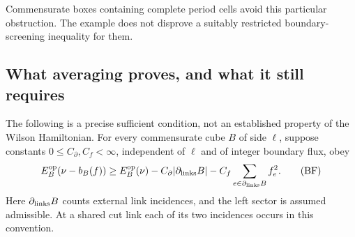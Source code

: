 Commensurate boxes containing complete period cells avoid this
particular obstruction.  The example does not disprove a suitably
restricted boundary-screening inequality for them.

\subsection{What averaging proves, and what it still requires}

The following is a precise sufficient condition, not an established
property of the Wilson Hamiltonian.
For every commensurate cube $B$ of side $\ell$, suppose constants
$0\le C_\partial,C_f<\infty$, independent of $\ell$ and of integer boundary
flux, obey
\begin{equation}
 E_B^{\rm op}(\nu-b_B(f))
 \ge E_B^{\rm op}(\nu)
       -C_\partial|\partial_{\rm links}B|
       -C_f\sum_{e\in\partial_{\rm links}B}f_e^2.
 \tag{BF}\label{therm4-boundary-hypothesis}
\end{equation}
Here $\partial_{\rm links}B$ counts external link incidences, and
the left sector is assumed admissible.  At a shared cut link each
of its two incidences occurs in this convention.

